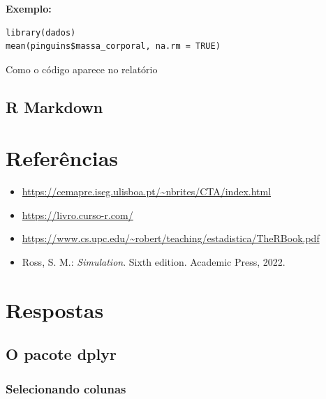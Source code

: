 \documentclass[
]{book}
\newenvironment{Shaded}{\begin{snugshade}}{\end{snugshade}}
\newcommand{\AttributeTok}[1]{\textcolor[rgb]{0.13,0.29,0.53}{#1}}
\newcommand{\ConstantTok}[1]{\textcolor[rgb]{0.56,0.35,0.01}{#1}}
\newcommand{\FunctionTok}[1]{\textcolor[rgb]{0.13,0.29,0.53}{\textbf{#1}}}
\newcommand{\NormalTok}[1]{#1}
\newcommand{\SpecialCharTok}[1]{\textcolor[rgb]{0.81,0.36,0.00}{\textbf{#1}}}
\providecommand{\tightlist}{%
  \setlength{\itemsep}{0pt}\setlength{\parskip}{0pt}}
\begin{document}
\textbf{Exemplo:}

\begin{verbatim}
library(dados)
mean(pinguins$massa_corporal, na.rm = TRUE)
\end{verbatim}

Como o código aparece no relatório

\begin{Shaded}
\end{Shaded}

\section{R Markdown}\label{r-markdown}

\chapter{Referências}\label{referuxeancias}

\begin{itemize}
\tightlist
\item
  \url{https://cemapre.iseg.ulisboa.pt/~nbrites/CTA/index.html}
\item
  \url{https://livro.curso-r.com/}
\item
  \url{https://www.cs.upc.edu/~robert/teaching/estadistica/TheRBook.pdf}
\item
  Ross, S. M.: \emph{Simulation}. Sixth edition. Academic Press, 2022.
\end{itemize}

\chapter{Respostas}\label{respostas}

\section{O pacote dplyr}\label{o-pacote-dplyr}

\subsection{Selecionando colunas}\label{selecionando-colunas}
\end{document}
